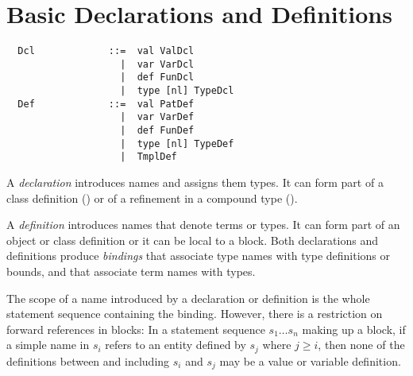 \chapter{Basic Declarations and Definitions}
\label{sec:defs}

\syntax\begin{lstlisting}
  Dcl             ::=  val ValDcl
                    |  var VarDcl
                    |  def FunDcl
                    |  type [nl] TypeDcl
  Def             ::=  val PatDef 
                    |  var VarDef 
                    |  def FunDef 
                    |  type [nl] TypeDef 
                    |  TmplDef
\end{lstlisting}

A {\em declaration} introduces names and assigns them types. It can
form part of a class definition () or of a
refinement in a compound type ().

A {\em definition} introduces names that denote terms or types. It can
form part of an object or class definition or it can be local to a
block.  Both declarations and definitions produce {\em bindings} that
associate type names with type definitions or bounds, and that
associate term names with types.

The scope of a name introduced by a declaration or definition is the
whole statement sequence containing the binding.  However, there is a
restriction on forward references in blocks: In a statement sequence
$s_1 \ldots s_n$ making up a block, if a simple name in $s_i$ refers
to an entity defined by $s_j$ where $j \geq i$, then none of the
definitions between and including $s_i$ and $s_j$ may be a value or
variable definition.

